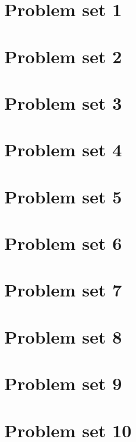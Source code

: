 \documentclass{article}
\newcommand{\addpset}[1]{
	\section{Problem set #1}
	
	\pagebreak
}
\begin{document}
\addpset{1}
\addpset{2}
\addpset{3}
\addpset{4}
\addpset{5}
\addpset{6}
\addpset{7}
\addpset{8}
\addpset{9}
\addpset{10}
\end{document}

